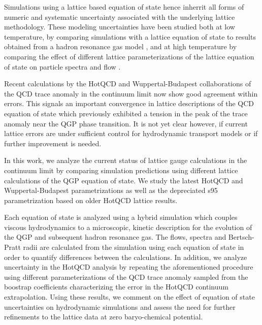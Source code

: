\documentclass[aps,prc,reprint,amsmath,nofootinbib,superscriptaddress]{revtex4-1}
\begin{document}
Simulations using a lattice based equation of state hence inherrit all forms of numeric and systematic uncertainty associated with the underlying 
lattice methodology. These modeling uncertainties have been studied both at low temperature, by comparing simulations with a lattice equation of 
state to results obtained from a hadron resonance gas model \cite{Huovinen:2009yb}, and at high temperature by comparing the effect of different 
lattice parameterizations of the lattice equation of state on particle spectra and flow \cite{Huovinen:2005gy, Huovinen:2009yb}. 


Recent calculations by the HotQCD and Wuppertal-Budapest collaborations of the QCD trace anomaly in the continuum limit now show good agreement within 
errors. This signals an important convergence in lattice descriptions of the QCD equation of state which previously exhibited a tension in the peak 
of the trace anomaly near the QGP phase transition. It is not yet clear however, if current lattice errors are under sufficient control for 
hydrodynamic transport models or if further improvement is needed.  

In this work, we analyze the current status of lattice gauge calculations in the continuum limit by comparing simulation predictions using different 
lattice calculations of the QGP equation of state. We study the latest HotQCD and Wuppertal-Budapest parametrizations as well as the depreciated s95 
parametrization based on older HotQCD lattice results. 

Each equation of state is analyzed using a hybrid simulation which couples viscous hydrodynamics to a microscopic, kinetic description for the evolution 
of the QGP and subsequent hadron resonance gas. The flows, spectra and Bertsch-Pratt radii are calculated from the simulation using each equation of state 
in order to quantify differences between the calculations. In addition, we analyze uncertainty in the HotQCD analysis by repeating the aforementioned 
procedure using different parameterizations of the QCD trace anomaly sampled from the boostrap coefficients characterizing the error in the HotQCD continuum 
extrapolation. Using these results, we comment on the effect of equation of state uncertainties on hydrodynamic simulations and assess the need for further 
refinements to the lattice data at zero baryo-chemical potential.
\end{document}
